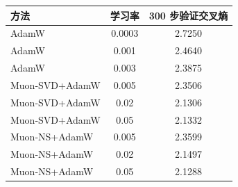 \begin{tabular}{lcc}\toprule
方法 & 学习率 & 300 步验证交叉熵 \\ \midrule
AdamW & 0.0003 & 2.7250 \\
AdamW & 0.001 & 2.4640 \\
AdamW & 0.003 & 2.3875 \\
Muon-SVD+AdamW & 0.005 & 2.3506 \\
Muon-SVD+AdamW & 0.02 & 2.1306 \\
Muon-SVD+AdamW & 0.05 & 2.1332 \\
Muon-NS+AdamW & 0.005 & 2.3599 \\
Muon-NS+AdamW & 0.02 & 2.1497 \\
Muon-NS+AdamW & 0.05 & 2.1288 \\
\bottomrule\end{tabular}
